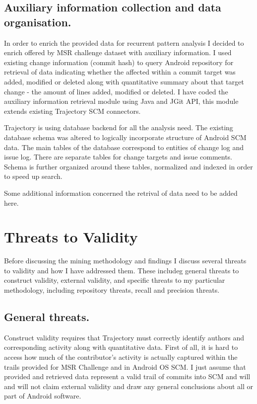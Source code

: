 \documentclass[a4paper,10pt]{article}
\numberwithin{equation}{subsection}
\begin{document}
\subsection{Auxiliary information collection and data organisation.}
In order to enrich the provided data for recurrent pattern analysis I decided to enrich offered by MSR
challenge dataset with auxiliary information. I used existing change information (commit hash) to 
query Android repository for retrieval of data indicating whether the affected within a commit target 
was added, modified or deleted along with quantitative summary about that target change - the amount of 
lines added, modified or deleted. I have coded the auxiliary information retrieval module using Java and
JGit API, this module extends existing Trajectory SCM connectors.

Trajectory is using database backend for all the analysis need. The existing database schema was altered
to logically incorporate structure of Android SCM data. The main tables of the database correspond to
entities of change log and issue log. There are separate tables for change targets and issue comments.
Schema is further organized around these tables, normalized and indexed in order to speed up search.

Some additional information concerned the retrival of data need to be added here.

\section{Threats to Validity}
Before discussing the mining methodology and findings I discuss several threats to validity and how 
I have addressed them. These includeg general threats to construct validity, external validity,
and specific threats to my particular methodology, including repository threats, recall and 
precision threats.

\subsection{General threats.}
Construct validity requires that Trajectory must correctly identify authors and corresponding activity
along with quantitative data. First of all, it is hard to access how much of the contributor's activity 
is actually captured within the trails provided for MSR Challenge and in Android OS SCM. I just assume 
that provided and retrieved data represent a valid trail of commits into SCM and will and will not 
claim external validity and draw any general conclusions about all or part of Android software. 
\end{document}
